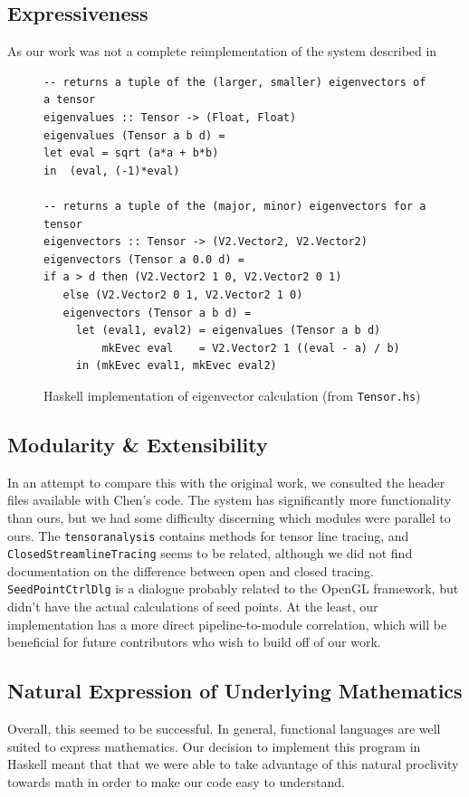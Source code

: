 \documentclass[twocolumn]{article}
\begin{document}
\subsection{Expressiveness}
As our work was not a complete reimplementation of the system described in
\cite{chen}

\begin{figure}[t!]
\begin{Verbatim}[frame=single]
-- returns a tuple of the (larger, smaller) eigenvectors of a tensor
eigenvalues :: Tensor -> (Float, Float)
eigenvalues (Tensor a b d) =
let eval = sqrt (a*a + b*b)
in  (eval, (-1)*eval)

-- returns a tuple of the (major, minor) eigenvectors for a tensor
eigenvectors :: Tensor -> (V2.Vector2, V2.Vector2)
eigenvectors (Tensor a 0.0 d) =
if a > d then (V2.Vector2 1 0, V2.Vector2 0 1)
   else (V2.Vector2 0 1, V2.Vector2 1 0)
   eigenvectors (Tensor a b d) =
     let (eval1, eval2) = eigenvalues (Tensor a b d)
         mkEvec eval    = V2.Vector2 1 ((eval - a) / b)
     in (mkEvec eval1, mkEvec eval2)
\end{Verbatim}

\caption{Haskell implementation of eigenvector calculation (from
            \texttt{Tensor.hs})}
\label{fig:evecs}
\end{figure}

\subsection{Modularity \& Extensibility}

In an attempt to compare this with the original work, we consulted the header
files available with Chen’s code. The system has significantly more
functionality than ours, but we had some difficulty discerning which modules
were parallel to ours. The \texttt{tensoranalysis} contains methods for tensor
line tracing, and \texttt{ClosedStreamlineTracing} seems to be related,
although we did not find documentation on the difference between open and
closed tracing. \texttt{SeedPointCtrlDlg} is a dialogue probably related to the
OpenGL framework, but didn’t have the actual calculations of seed points. At
the least, our implementation has a more direct pipeline-to-module correlation,
which will be beneficial for future contributors who wish to build off of our
work.

\subsection{Natural Expression of Underlying Mathematics}
Overall, this seemed to be successful. In general, functional languages are
well suited to express mathematics. Our decision to implement this program in
Haskell meant that that we were able to take advantage of this natural
proclivity towards math in order to make our code easy to understand.
\end{document}
